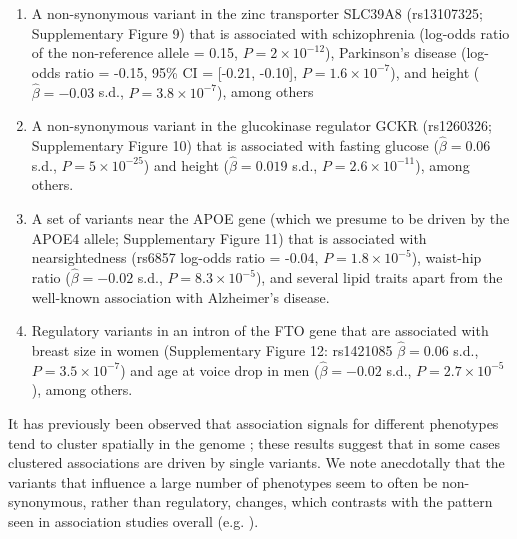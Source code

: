 \documentclass[11pt,titlepage]{article}
\begin{document}
\begin{enumerate}
\item A non-synonymous variant in the zinc transporter SLC39A8 (rs13107325; Supplementary Figure 9) that is associated with schizophrenia (log-odds ratio of the non-reference allele = 0.15, $P = 2 \times 10^{-12}$), Parkinson's disease (log-odds ratio = -0.15, 95\% CI = [-0.21, -0.10], $P = 1.6 \times 10^{-7}$), and height ($\hat \beta = -0.03$ s.d.,  $P = 3.8\times 10^{-7}$), among others
\item A non-synonymous variant in the glucokinase regulator GCKR (rs1260326; Supplementary Figure 10) that is associated with fasting glucose ($\hat \beta = 0.06$ s.d.,  $P =  5\times10^{-25}$) and height ($\hat \beta = 0.019$ s.d., $P = 2.6\times 10^{-11}$), among others.
\item A set of variants near the APOE gene (which we presume to be driven by the APOE4 allele; Supplementary Figure 11) that is associated with nearsightedness (rs6857 log-odds ratio = -0.04,  $P =  1.8 \times 10^{-5}$), waist-hip ratio ($\hat \beta = -0.02$ s.d., $P = 8.3\times 10^{-5}$), and several lipid traits apart from the well-known association with Alzheimer's disease.
\item Regulatory variants in an intron of the FTO gene \citep{Smemo:2014aa, Claussnitzer:2015aa} that are associated with breast size in women (Supplementary Figure 12: rs1421085 $\hat \beta = 0.06$ s.d., $P = 3.5 \times 10^{-7}$) and age at voice drop in men ($\hat \beta = -0.02$ s.d., $P = 2.7 \times 10^{-5}$), among others.
\end{enumerate}
It has previously been observed that association signals for different phenotypes tend to cluster spatially in the genome \citep{Jeck:2012aa}; these results suggest that in some cases clustered associations are driven by single variants. 
We note anecdotally that the variants that influence a large number of phenotypes seem to often be non-synonymous, rather than regulatory, changes, which contrasts with the pattern seen in association studies overall (e.g. \citet{pickrell2013joint}).
\end{document}
